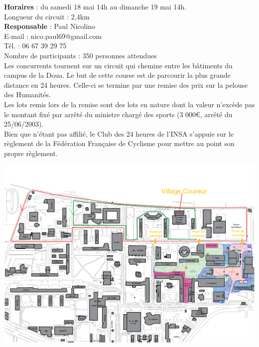 \documentclass[hidelinks, paper=a4, fontsize=13pt]{report}
\begin{document}
\textbf{Horaires} : du samedi 18 mai 14h au dimanche 19 mai 14h.\\

Longueur du circuit : 2,4km \\

\textbf{Responsable} : Paul Nicolino\\
	E-mail : nico.paul69@gmail.com\\
	Tél. : 06 67 39 29 75\\

Nombre de participants : 350 personnes attendues\\

Les concurrents tournent sur un circuit qui chemine entre les bâtiments du campus de la Doua. Le but de cette course est de parcourir la plus grande distance en 24 heures. Celle-ci se termine par une remise des prix sur la pelouse des Humanités.\\
Les lots remis lors de la remise sont des lots en nature dont la valeur n'excède pas le montant fixé par arrêté du ministre chargé des sports (3 000\euro{}, arrêté du 25/06/2003).\\
Bien que n’étant pas affilié, le Club des 24 heures de l'INSA s’appuie sur le règlement de la Fédération Française de Cyclisme pour mettre au point son propre règlement.

\begin{center}
\includegraphics[width=\textwidth,keepaspectratio,angle=90]{Exports/Plan_24h_45eme-Parcours_courses}
\end{center}
\end{document}
